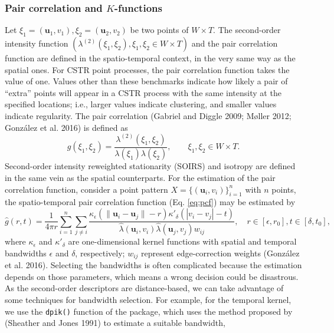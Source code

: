 \hypertarget{pair-correlation-and-k-functions-1}{%
\subsubsection{\texorpdfstring{Pair correlation and \(K\)-functions}{Pair correlation and K-functions}}\label{pair-correlation-and-k-functions-1}}

Let \(\xi_1 = (\mathbf{u}_1,v_1),\xi_2 = (\mathbf{u}_2,v_2)\) be two points of \(W\times T\). The second-order intensity function \((\lambda^{(2)}(\xi_1,\xi_2), \xi_1,\xi_2\in W\times T)\) and the pair correlation function are defined in the spatio-temporal context, in the very same way as the spatial ones. For CSTR point processes, the pair correlation function takes the value of one. Values other than these benchmarks indicate how likely a pair of ``extra'' points will appear in a CSTR process with the same intensity at the specified locations; i.e., larger values indicate clustering, and smaller values indicate regularity. The pair correlation (Gabriel and Diggle 2009; Møller 2012; González et al. 2016) is defined as
\begin{equation}
    g(\xi_1,\xi_2)=\frac{\lambda^{(2)}(\xi_1,\xi_2)}{\lambda(\xi_1)\lambda(\xi_2)}, \qquad \xi_1,\xi_2\in W\times T.
    \label{eq:pcf}
\end{equation}
Second-order intensity reweighted stationarity (SOIRS) and isotropy are defined in the same vein as the spatial counterparts. For the estimation of the pair correlation function, consider a point pattern \(X=\{(\mathbf{u}_{i},v_i)\}_{i=1}^n\) with \(n\) points, the spatio-temporal pair correlation function (Eq. \eqref{eq:pcf}) may be estimated by
\[
    \hat{g}(r,t)=\frac{1}{4\pi r}
    \sum_{i=1}^n \sum_{j\neq i}
    \frac{\kappa_{\epsilon}(\|\mathbf{u}_{i}-\mathbf{u}_{j}\|- r)\kappa'_{\delta}(|v_{i}-v_{j}|-t)}{\hat{\lambda} \left( \mathbf{u}_{i},v_{i}\right) \hat{\lambda} \left(\mathbf{u}_{j},v_{j}\right) w_{ij}
    }, \quad r \in [\epsilon, r_0], t\in [\delta, t_0],
\]
where \(\kappa_{\epsilon}\) and \(\kappa'_{\delta}\) are one-dimensional kernel functions with spatial and temporal bandwidths \(\epsilon\) and \(\delta\), respectively; \(w_{ij}\) represent edge-correction weights (González et al. 2016). Selecting the bandwidths is often complicated because the estimation depends on those parameters, which means a wrong decision could be disastrous. As the second-order descriptors are distance-based, we can take advantage of some techniques for bandwidth selection. For example, for the temporal kernel, we use the \texttt{dpik()} function of the  package, which uses the method proposed by (Sheather and Jones 1991) to estimate a suitable bandwidth,

